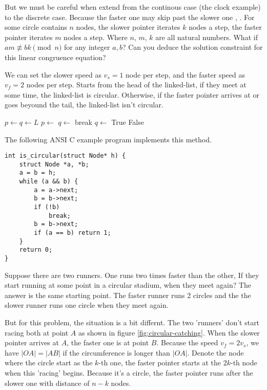 \documentclass{article}
\begin{document}
But we must be careful when extend from the continous case (the clock example) to
the discrete case. Because the faster one may skip past the slower one \cite{Stepanov09}, \cite{TAOCP2}.
For some circle contains $n$ nodes, the
slower pointer iterates $k$ nodes a step, the faster pointer iterates $m$ nodes a step.
Where $n$, $m$, $k$ are all natural numbers. What if $am \not\equiv bk \pmod n$ for
any integer $a, b$? Can you deduce the solution constraint for this linear congruence equation?

We can set the slower speed as $v_s = 1$ node per step,
and the faster speed as $v_f = 2$ nodes per step. Starts from the head of the linked-list, if they
meet at some time, the linked-list is circular. Otherwise, if the faster pointer
arrives at or goes beyound the tail, the linked-list isn't circular.

\begin{algorithmic}[1]
  \State $p \gets q \gets L$
    \State $p \gets$ 
    \State $q \gets$ 
      \State break
    \EndIf
    \State $q \gets$ 
      \State \Return True
    \EndIf
  \EndWhile
  \State \Return False
\EndFunction
\end{algorithmic}

The following ANSI C example program implements this method.

\lstset{language=C}
\begin{lstlisting}
int is_circular(struct Node* h) {
    struct Node *a, *b;
    a = b = h;
    while (a && b) {
        a = a->next;
        b = b->next;
        if (!b)
            break;
        b = b->next;
        if (a == b) return 1;
    }
    return 0;
}
\end{lstlisting}

Suppose there are two runners. One runs two times faster than the other, If they start
running at some point in a circular stadium, when they meet again? The answer is the
same starting point. The faster runner runs 2 circles and the the slower runner runs
one circle when they meet again.

But for this problem, the situation is a bit differnt. The two 'runners' don't
start racing both at point $A$ as shown in figure \ref{fig:circular-catching}.
When the slower pointer arrives
at $A$, the faster one is at point $B$. Because the speed $v_f = 2v_s$, we have
$|OA| = |AB|$ if the circumference is longer than $|OA|$.
Denote the node where the circle start as the $k$-th one, the
faster pointer starts at the $2k$-th node when this 'racing' begins. Because it's
a circle, the faster pointer runs after the slower one with distance of $n-k$ nodes.
\end{document}
